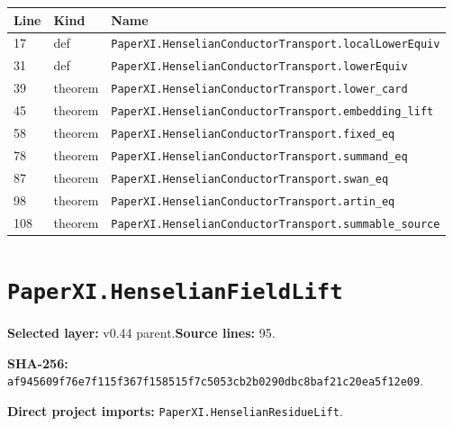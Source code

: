 \documentclass[10pt,oneside]{book}
\begin{document}
\begin{longtable}{@{}p{}p{}p{}@{}}\toprule Line&Kind&Name\\\midrule\endhead

17&def&\nolinkurl{PaperXI.HenselianConductorTransport.localLowerEquiv}\\

31&def&\nolinkurl{PaperXI.HenselianConductorTransport.lowerEquiv}\\

39&theorem&\nolinkurl{PaperXI.HenselianConductorTransport.lower_card}\\

45&theorem&\nolinkurl{PaperXI.HenselianConductorTransport.embedding_lift}\\

58&theorem&\nolinkurl{PaperXI.HenselianConductorTransport.fixed_eq}\\

78&theorem&\nolinkurl{PaperXI.HenselianConductorTransport.summand_eq}\\

87&theorem&\nolinkurl{PaperXI.HenselianConductorTransport.swan_eq}\\

98&theorem&\nolinkurl{PaperXI.HenselianConductorTransport.artin_eq}\\

108&theorem&\nolinkurl{PaperXI.HenselianConductorTransport.summable_source}\\

\bottomrule\end{longtable}

\section{\texorpdfstring{\nolinkurl{PaperXI.HenselianFieldLift}}{PaperXI.HenselianFieldLift}}\label{module:PaperXI.HenselianFieldLift}

\textbf{Selected layer:} v0.44 parent.\quad\textbf{Source lines:} 95.\par\textbf{SHA-256:} {\scriptsize\nolinkurl{af945609f76e7f115f367f158515f7c5053cb2b0290dbc8baf21c20ea5f12e09}}.


\textbf{Direct project imports:} \nolinkurl{PaperXI.HenselianResidueLift}.
\end{document}
